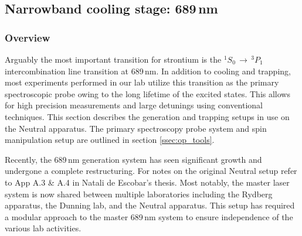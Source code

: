 \pagebreak
\subsection{Narrowband cooling stage: 689\,nm} \label{ssec:689sys}
\subsubsection{Overview}
Arguably the most important transition for strontium is the $^1S_0\,\rightarrow\,^3P_1$ intercombination line transition at 689\,nm.
In addition to cooling and trapping, most experiments performed in our lab utilize this transition as the primary spectroscopic probe owing to the long lifetime of the excited states.
This allows for high precision measurements and large detunings using conventional techniques.
This section describes the generation and trapping setups in use on the Neutral apparatus.
The primary spectroscopy probe system and spin manipulation setup are outlined in section \ref{ssec:op_tools}.

Recently, the 689\,nm generation system has seen significant growth and undergone a complete restructuring. 
For notes on the original Neutral setup refer to App A.3 \& A.4 in Natali de Escobar's thesis.
Most notably, the master laser system is now shared between multiple laboratories including the Rydberg apparatus, the Dunning lab, and the Neutral apparatus.
This setup has required a modular approach to the master 689\,nm system to ensure independence of the various lab activities.

